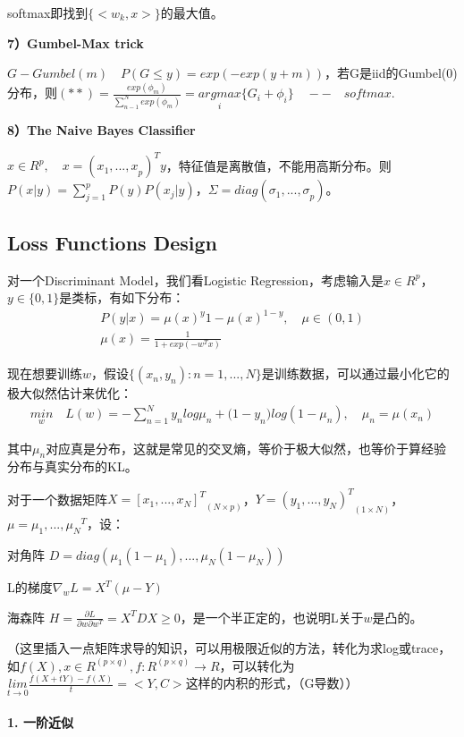 \documentclass[12pt,UTF8,AutoFakeBold]{article}
\begin{document}
softmax即找到$\{ <{ { w }_{ k } },x>\} $的最大值。

\textbf{7）Gumbel-Max trick}

$G-Gumbel(m)\quad P(G\le y)=exp(-exp(y+m))$，若G是iid的Gumbel(0)分布，则$(**)=\frac { exp({ \phi  }_{ m }) }{ \sum _{ n-1 }^{ N }{ exp({ \phi  }_{ m }) }  } =\underset { i }{ argmax } \{ { G }_{ i }+{ \phi  }_{ i }\} \quad -- \quad softmax$.

\textbf{8）The Naive Bayes Classifier}

${ x }\in { R }^{ p },\quad x={ ({ x }_{ 1 }{ ,...,x }_{ p }) }^{ T }{ y }$，特征值是离散值，不能用⾼斯分布。则$P(x|y)=\sum _{ j=1 }^{ p }{ P(y)P({ x }_{ j }|y) } $，$\Sigma =diag({ \sigma  }_{ 1 }{ ,...,\sigma  }_{ p })$。

\subsection{Loss Functions Design}

对一个Discriminant Model，我们看Logistic Regression，考虑输入是$x\in{R^p}$，$y\in{\{0,1\}}$是类标，有如下分布：
\begin{gather}
P(y|x) = {\mu(x)}^{y}{1-\mu(x)}^{1-y}, \quad {\mu}\in{(0,1)}\\
\mu { (x) }=\frac { 1 }{ 1+exp(-{ w }^{ T }x) } 
\end{gather}

现在想要训练$w$，假设$\{(x_n,y_n):n=1,...,N\}$是训练数据，可以通过最小化它的极大似然估计来优化：
\begin{gather}
\underset { w }{ min } \quad L(w)=-\sum _{ n=1 }^{ N }{ { y }_{ n }log{ \mu  }_{ n }+{ (1-y }_{ n })log(1-{ \mu  }_{ n }) } , \quad \mu_n=\mu(x_n)
\end{gather}

其中$\mu_n$对应真是分布，这就是常见的交叉熵，等价于极大似然，也等价于算经验分布与真实分布的KL。

对于一个数据矩阵$X={{[x_1,...,x_N]}^T}_{(N\times p)}$，$Y={{(y_1,...,y_N)}^T}_{(1\times  N)}$，${\mu} ={\mu_1,...,\mu_N}^T$，设：

对角阵 $D = diag(\mu_1(1-\mu_1),...,\mu_N(1-\mu_N))$

L的梯度$ { \nabla  }_{ w }L={ X }^{ T }(\mu - Y)$

海森阵 $H=\frac { \partial L }{ \partial w\partial { w }^{ T } } ={ X }^{ T }DX \ge 0$，是一个半正定的，也说明L关于$w$是凸的。

（这里插入一点矩阵求导的知识，可以用极限近似的方法，转化为求log或trace，如$f(X),x\in R^{(p\times q)},f:R^{(p\times q)}\rightarrow R$，可以转化为$\underset { t\rightarrow 0 }{ lim } \frac { f(X+tY)-f(X) }{ t } =<Y,C>$这样的内积的形式，（G导数））\\
\\
\textbf{1. 一阶近似}\\
\end{document}
